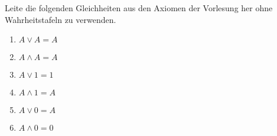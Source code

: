 \begin{exercise}
  Leite die folgenden Gleichheiten aus den Axiomen der Vorlesung her ohne
  Wahrheitstafeln zu verwenden.
  \begin{enumerate}
  \item $A \lor A = A$
  \item $A \land A = A$
  \item $A \lor 1 = 1$
  \item $A \land 1 = A$
  \item $A \lor 0 = A$
  \item $A \land 0 = 0$
  \end{enumerate}
\end{exercise}

